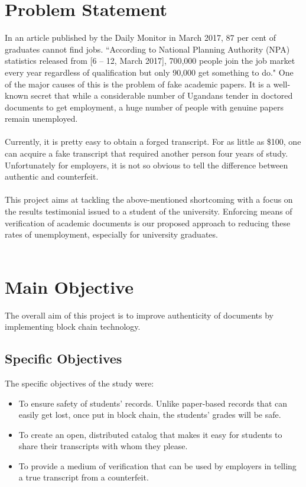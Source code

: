\section{Problem Statement}
In an article published by the Daily Monitor in March 2017, 87 per cent of graduates cannot find jobs. ``According to National Planning Authority (NPA) statistics released from [6 – 12, March 2017], 700,000 people join the job market every year regardless of qualification but only 90,000 get something to do."\cite{art11} 
One of the major causes of this is the problem of fake academic papers. It is a well-known secret that while a considerable number of Ugandans tender in doctored documents to get employment, a huge number of people with
genuine papers remain unemployed.\\\\
Currently, it is pretty easy to obtain a forged transcript. For as little as \$100, one can acquire a fake transcript that required another person four years of study. Unfortunately for employers, it is not so obvious to tell the difference between authentic and counterfeit.\\\\
This project aims at tackling the above-mentioned shortcoming with a focus on the results testimonial issued to a student of the university. Enforcing means of verification of academic documents is our proposed approach to reducing these rates of unemployment, especially for university graduates.\\\\

\section{Main Objective}
The overall aim of this project is to improve authenticity of documents by implementing block chain technology.
\subsection{Specific Objectives}
The specific objectives of the study were: 
\begin{itemize}
\item To ensure safety of students' records. Unlike paper-based records that can easily get lost, once put in block chain, the students' grades will be safe.
\item To create an open, distributed catalog that makes it easy for students to share their transcripts with whom they please.
\item To provide a medium of verification that can be used by employers in telling a true transcript from a counterfeit.
\end{itemize}
